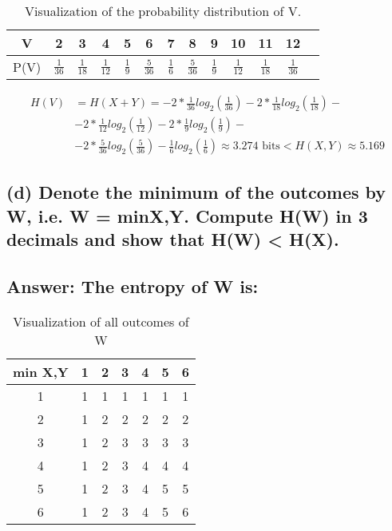 \documentclass[15px]{article}
\begin{document}
\begin{table}[t]
\centering
\begin{adjustbox}{width=0.8\linewidth}
\begin{tabular}{c|c|c|c|c|c|c|c|c|c|c|c|c}

V & 2 & 3 & 4 & 5 & 6 & 7 & 8 & 9 & 10 & 11 & 12\\ \hline
P(V) & $\frac{1}{36}$ & $\frac{1}{18}$ & $\frac{1}{12}$ & $\frac{1}{9}$ & $\frac{5}{36}$ & $\frac{1}{6}$ & $\frac{5}{36}$ & $\frac{1}{9}$ & $\frac{1}{12}$ & $\frac{1}{18}$ & $\frac{1}{36}$\\
\end{tabular}
\end{adjustbox}
\caption{Visualization of the probability distribution of V.} 
\end{table}

\begin{equation}
\begin{split}
H(V) & = H(X+Y) = -2*\frac{1}{36}log_2(\frac{1}{36}) - 2*\frac{1}{18}log_2(\frac{1}{18}) - \\ 
& - 2*\frac{1}{12}log_2(\frac{1}{12}) - 2*\frac{1}{9}log_2(\frac{1}{9}) - \\ 
& - 2*\frac{5}{36}log_2(\frac{5}{36}) - \frac{1}{6}log_2(\frac{1}{6}) \approx 3.274 \text{ bits} < H(X,Y) \approx 5.169
\end{split}
\end{equation}

\subsection*{\normalfont (d) Denote the minimum of the outcomes by W, i.e. W = min{X,Y}. Compute H(W) in 3 decimals and show that H(W) < H(X).}

\subsection*{Answer: The entropy of W is:}

\begin{table}[ht]
\centering
\begin{adjustbox}{width=0.5\linewidth}
\begin{tabular}{|c|c|c|c|c|c|c|}
\hline
min X,Y & 1 & 2 & 3 & 4 & 5 & 6 \\ \hline
1 & 1 & 1 & 1 & 1 & 1 & 1 \\ \hline
2 & 1 & 2 & 2 & 2 & 2 & 2 \\ \hline
3 & 1 & 2 & 3 & 3 & 3 & 3\\ \hline
4 & 1 & 2 & 3 & 4 & 4 & 4\\ \hline
5 & 1 & 2 & 3 & 4 & 5 & 5\\ \hline
6 & 1 & 2 & 3 & 4 & 5 & 6\\ \hline
\end{tabular}
\end{adjustbox}
\caption{Visualization of all outcomes of W} 
\end{table}
\end{document}
